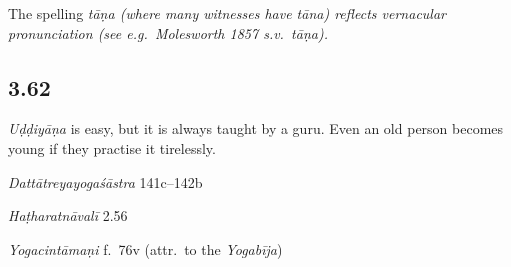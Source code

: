 \begin{ekdosis}
\begin{testimonia}[hp03_061]
\end{testimonia}

\begin{philcomm}[hp03_061]
The spelling \sl{tāṇa} (where many witnesses have \emph{tāna}) reflects vernacular pronunciation (see e.g.~Molesworth 1857 s.v.~\emph{tāṇa}). 
\end{philcomm}


\subsection*{3.62}
\begin{translation}[hp03_062]   
\emph{Uḍḍiyāṇa} is easy, but it is always taught by a guru. Even an old person becomes young if they practise it tirelessly.%
\end{translation}

\begin{sources}[hp03_062]
\emph{Dattātreyayogaśāstra} 141c–142b
\begin{versinnote}
\tl{\var{141d guruṇā ] guṇaughāt \pi}\\!}
\end{versinnote}
\end{sources}

\begin{testimonia}[hp03_062]
\emph{Haṭharatnāvalī} 2.56
\begin{versinnote}
\end{versinnote}

\emph{Yogacintāmaṇi} f.~76v (attr.~to the \emph{Yogabīja})
\begin{versinnote}
\end{versinnote}


\end{testimonia}
\end{ekdosis}
